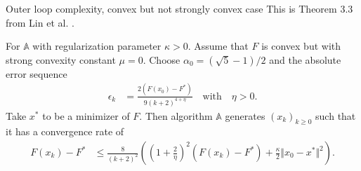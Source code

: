 \documentclass[11pt]{beamer}
\theoremstyle{definition}
\begin{document}
        \begin{frame}{Outer loop complexity, convex but not strongly convex case}
            This is Theorem 3.3 from Lin et al. \cite{lin_universal_2015}. 
            \begin{theorem}[]\label{thm:erro-seq-outer-cnvx}
            {\small
                For $\mathbb A$ with regularization parameter $\kappa > 0$. 
                Assume that $F$ is convex but with strong convexity constant $\mu = 0$. 
                Choose $\alpha_0 = (\sqrt{5} - 1)/2$ and the absolute error sequence 
                \begin{align*}
                    \epsilon_k &= \frac{2(F(x_0) - F^*)}{9(k + 2)^{4 + \eta}} \quad 
                    \text{with}\quad \eta > 0. 
                \end{align*}
                Take $x^*$ to be a minimizer of $F$. 
                Then algorithm $\mathbb A$ generates $(x_k)_{k \ge0}$ such that it has a convergence rate of 
                \begin{align*}
                    F(x_k) - F^* &\le 
                    \frac{8}{(k + 2)^2}\left(
                        \left(1 + \frac{2}{\eta}\right)^2(F(x_k) - F^*)
                        + \frac{\kappa}{2}\Vert x_0 - x^*\Vert^2
                    \right).
                \end{align*}
            }
            \end{theorem}
        \end{frame}
\end{document}
